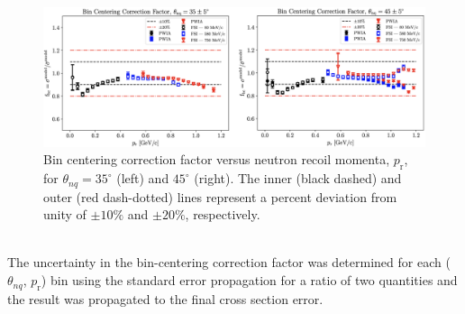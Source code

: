\documentclass[aps, prl]{revtex4-2}  %
\begin{document}
\begin{figure}[!ht]
\includegraphics[scale=0.27]{BC_factor.png}
\caption{Bin centering correction factor versus neutron recoil momenta, $p_{\mathrm{r}}$, for $\theta_{nq}=35^{\circ}$ (left) and $45^{\circ}$ (right).
  The inner (black dashed) and outer (red dash-dotted) lines represent a percent deviation from unity of $\pm10\%$ and $\pm20\%$, respectively.}
\label{fig:BC_factor}
\end{figure}\\
\indent The uncertainty in the bin-centering correction factor was determined for each  ($\theta_{nq}$, $p_{\mathrm{r}}$) bin
using the standard error propagation for a ratio of two quantities and the result was propagated to the final cross section error. \\
\end{document}
